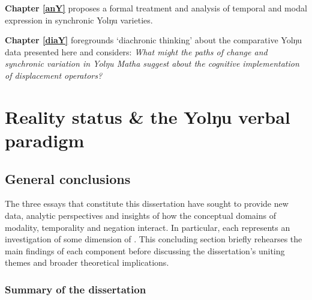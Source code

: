 \documentclass[11pt,dvipsnames]{report}
\newcommand{\mcom}[1]
{\marginpar{\color{black}\raggedleft\raggedright\hspace{0pt}\linespread{0.9}\footnotesize{#1}}}
\begin{document}
		\textbf{Chapter \ref{anY}} proposes a formal treatment and analysis of temporal and modal expression in synchronic Yolŋu varieties.
		
		\textbf{Chapter \ref{diaY} }foregrounds `diachronic thinking' about the comparative Yolŋu data presented here and considers: {\em What might the paths of change and synchronic variation in Yolŋu Matha suggest about the cognitive implementation of displacement operators?}
		\vfill
		
		\upshape 
\fi


\part{Reality status \& the Yolŋu verbal paradigm}\label{yolŋu}
%


%

\chapter{General conclusions}



The three essays that constitute this dissertation have sought to provide new data, analytic perspectives and insights of how the conceptual domains of modality, temporality and negation interact. In particular, each represents an investigation of some dimension of . This concluding section briefly rehearses the main findings of each component before discussing the dissertation's uniting themes and broader theoretical implications.

\section[Dissertation summary]{Summary of the dissertation}
\end{document}
